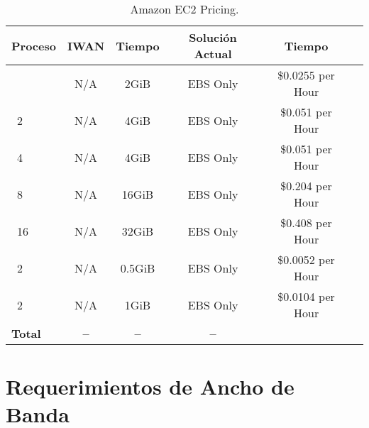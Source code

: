 \begin{table}[ht]
	\caption{Amazon EC2 Pricing.}
	\label{tab:hla:results}
\centering
\begin{tabular}{lccccc}
	\toprule
	\multicolumn{1}{c}{\textbf{Proceso}} 	& \textbf{IWAN}	& \textbf{Tiempo}	& \textbf{Solución Actual}
	& \textbf{Tiempo}\\
	\midrule
\cite{Aprovisionamiento tienda nueva} 		& N/A & 2GiB & EBS Only	& \$0.0255 per Hour \\
\cite{a1.large}~2 		& N/A & 4GiB & EBS Only & \$0.051 per Hour	\\
\cite{a1.xlarge}~4		& N/A & 4GiB & EBS Only & \$0.051 per Hour	\\
\cite{a1.2xlarge}~8 	& N/A & 16GiB & EBS Only & \$0.204 per Hour	\\
\cite{a1.4xlarge}~16	& N/A & 32GiB & EBS Only & \$0.408 per Hour	\\
\cite{t3.nano}~2		& N/A & 0.5GiB & EBS Only & \$0.0052 per Hour	\\
\cite{t3.micro}~2   	& N/A & 1GiB & EBS Only & \$0.0104 per Hour	\\
	\midrule
	\textbf{Total}			& \textbf{--}		& \textbf{--}		& \textbf{--} \\
	\bottomrule
\end{tabular}
\end{table}

\section{Requerimientos de Ancho de Banda} %
\label{sec:Requerimientos de Ancho de Banda}

